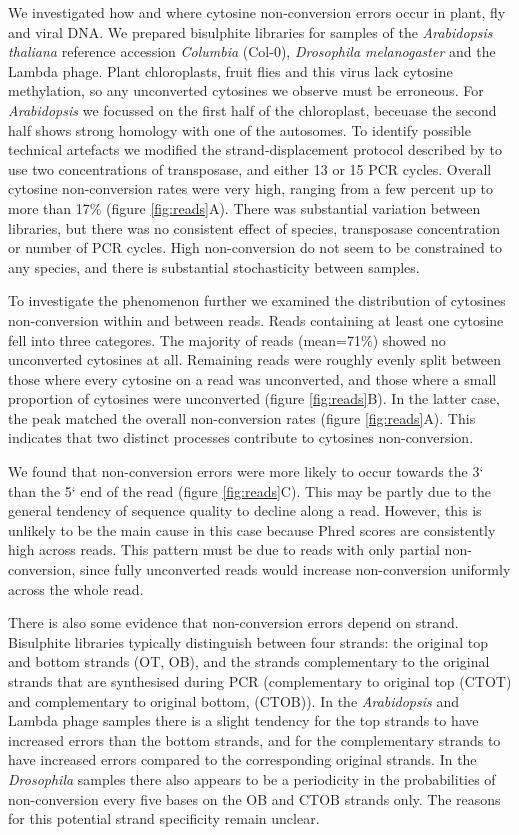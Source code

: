 \documentclass[12pt,longbibliography]{article}
\begin{document}
We investigated how and where cytosine non-conversion errors occur in plant, fly and viral DNA.
We prepared bisulphite libraries for samples of the \textit{Arabidopsis thaliana} reference accession \textit{Columbia} (Col-0), \textit{Drosophila melanogaster} and the Lambda phage.
Plant chloroplasts, fruit flies and this virus lack cytosine methylation, so any unconverted cytosines we observe must be erroneous.
For \textit{Arabidopsis} we focussed on the first half of the chloroplast, beceuase the second half shows strong homology with one of the autosomes.
To identify possible technical artefacts we modified the strand-displacement protocol described by \textcite{weichenhan2018tagmentation} to use two concentrations of transposase, and either 13 or 15 PCR cycles.
Overall cytosine non-conversion rates were very high, ranging from a few percent up to more than 17\% (figure \ref{fig:reads}A).
There was substantial variation between libraries, but there was no consistent effect of species, transposase concentration or number of PCR cycles.
High non-conversion do not seem to be constrained to any species, and there is substantial stochasticity between samples.

To investigate the phenomenon further we examined the distribution of cytosines non-conversion within and between reads.
Reads containing at least one cytosine fell into three categores.
The majority of reads (mean=71\%) showed no unconverted cytosines at all.
Remaining reads were roughly evenly split between those where every cytosine on a read was unconverted, and those where a small proportion of cytosines were unconverted (figure \ref{fig:reads}B).
In the latter case, the peak matched the overall non-conversion rates (figure \ref{fig:reads}A).
This indicates that two distinct processes contribute to cytosines non-conversion.

We found that non-conversion errors were more likely to occur towards the 3` than the 5` end of the read (figure \ref{fig:reads}C).
This may be partly due to the general tendency of sequence quality to decline along a read.
However, this is unlikely to be the main cause in this case because Phred scores are consistently high across reads.
This pattern must be due to reads with only partial non-conversion, since fully unconverted reads would increase non-conversion uniformly across the whole read.

There is also some evidence that non-conversion errors depend on strand.
Bisulphite libraries typically distinguish between four strands: the original top and bottom strands (OT, OB), and the strands complementary to the original strands that are synthesised during PCR (complementary to original top (CTOT) and complementary to original bottom, (CTOB)).
In the \textit{Arabidopsis} and Lambda phage samples there is a slight tendency for the top strands to have increased errors than the bottom strands, and for the complementary strands to have increased errors compared to the corresponding original strands.
In the \textit{Drosophila} samples there also appears to be a periodicity in the probabilities of non-conversion every five bases on the OB and CTOB strands only.
The reasons for this potential strand specificity remain unclear.
\end{document}
